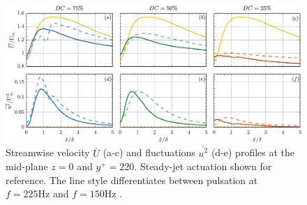 \begin{figure} %
    \centering
    \includegraphics[width=0.99\linewidth]{figures/F10.pdf}
    \caption{Streamwise velocity $\overline{U}$ (a-c) and fluctuations $\overline{u^2}$ (d-e) profiles at the mid-plane $z=0$ and $y^+ = 220$. Steady-jet  actuation shown for reference. The line style differentiates between pulsation at $f = 225\mathrm{Hz}$  and $f = 150\mathrm{Hz}$ .}
    \label{fig:PIV_profile_b}
\end{figure}

